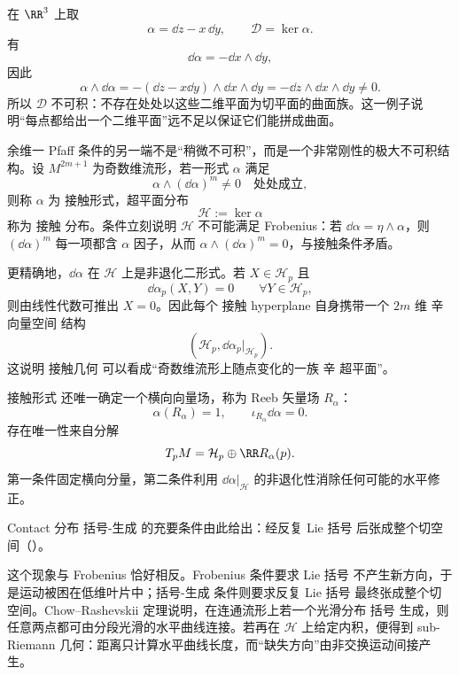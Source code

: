 \begin{exbox}[接触型平面场不可积]
在 $\RR^3$ 上取
\[
\alpha=\dd z-x\,\dd y,
\qquad
\mathcal D=\ker\alpha.
\]
有
\[
\dd\alpha=-\dd x\wedge\dd y,
\]
因此
\[
\alpha\wedge\dd\alpha
=-(\dd z-x\dd y)\wedge\dd x\wedge\dd y
=-\dd z\wedge\dd x\wedge\dd y\neq0.
\]
所以 $\mathcal D$ 不可积：不存在处处以这些二维平面为切平面的曲面族。这一例子说明“每点都给出一个二维平面”远不足以保证它们能拼成曲面。
\end{exbox}

余维一 Pfaff 条件的另一端不是“稍微不可积”，而是一个非常刚性的极大不可积结构。设 $M^{2m+1}$ 为奇数维流形，若一形式 $\alpha$ 满足
\begin{equation}
\boxed{
\alpha\wedge(\dd\alpha)^m\neq0
\quad\text{处处成立},
}
\label{eq:math-dg-contact-condition}
\end{equation}
则称 $\alpha$ 为 接触形式，超平面分布
\[
\mathcal H:=\ker\alpha
\]
称为 接触 分布。条件立刻说明 $\mathcal H$ 不可能满足 Frobenius：若 $\dd\alpha=\eta\wedge\alpha$，则 $(\dd\alpha)^m$ 每一项都含 $\alpha$ 因子，从而 $\alpha\wedge(\dd\alpha)^m=0$，与接触条件矛盾。

更精确地，$\dd\alpha$ 在 $\mathcal H$ 上是非退化二形式。若 $X\in\mathcal H_p$ 且
\[
\dd\alpha_p(X,Y)=0
\qquad\forall Y\in\mathcal H_p,
\]
则由线性代数可推出 $X=0$。因此每个 接触 hyperplane 自身携带一个 $2m$ 维 辛 向量空间 结构
\begin{equation*}\left(\mathcal H_p,\dd\alpha_p|_{\mathcal H_p}\right).\end{equation*}
这说明 接触几何 可以看成“奇数维流形上随点变化的一族 辛 超平面”。

接触形式 还唯一确定一个横向向量场，称为 Reeb 矢量场 $R_\alpha$：
\begin{equation*}\boxed{
\alpha(R_\alpha)=1,
\qquad
\iota_{R_\alpha}\dd\alpha=0.
}\end{equation*}
存在唯一性来自分解
\[
T_pM=\mathcal H_p\oplus\RR R_\alpha(p).
\]
第一条件固定横向分量，第二条件利用 $\dd\alpha|_{\mathcal H}$ 的非退化性消除任何可能的水平修正。

Contact 分布 括号-生成 的充要条件由此给出：经反复 Lie 括号 后张成整个切空间（）。

这个现象与 Frobenius 恰好相反。Frobenius 条件要求 Lie 括号 不产生新方向，于是运动被困在低维叶片中；括号-生成 条件则要求反复 Lie 括号 最终张成整个切空间。Chow--Rashevskii 定理说明，在连通流形上若一个光滑分布 括号 生成，则任意两点都可由分段光滑的水平曲线连接。若再在 $\mathcal H$ 上给定内积，便得到 sub-Riemann 几何：距离只计算水平曲线长度，而“缺失方向”由非交换运动间接产生。


